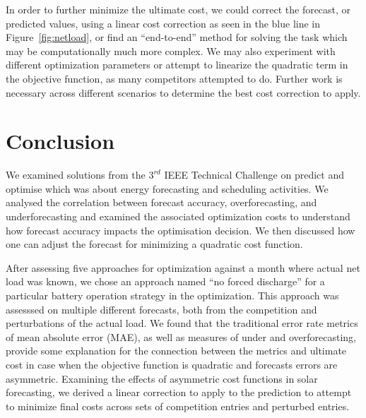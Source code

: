 \documentclass[conference]{IEEEtran}
\begin{document}

In order to further minimize the ultimate cost, we could correct the forecast, or predicted values, using a linear cost correction as seen in the blue line in Figure~\ref{fig:netload}, or find an ``end-to-end'' method for solving the task which may be computationally much more complex. We may also experiment with different optimization parameters or attempt to linearize the quadratic term in the objective function, as many competitors attempted to do. Further work is necessary across different scenarios to determine the best cost correction to apply.

\section{Conclusion}

We examined solutions from the $3^{rd}$ IEEE Technical Challenge on predict and optimise which was about energy forecasting and scheduling activities. We analysed the correlation between forecast accuracy, overforecasting, and underforecasting and examined the associated optimization costs to understand how forecast accuracy impacts the optimisation decision. We then discussed how one can adjust the forecast for minimizing a quadratic cost function. 

After assessing five approaches for optimization against a month where actual net load was known, we chose an approach named ``no forced discharge'' for a particular battery operation strategy in the optimization. This approach was assesssed on multiple different forecasts, both from the competition and perturbations of the actual load. We found that the traditional error rate metrics of mean absolute error (MAE), as well as measures of under and overforecasting, provide some explanation for the connection between the metrics and ultimate cost in case when the objective function is quadratic and forecasts errors are asymmetric. Examining the effects of asymmetric cost functions in solar forecasting, we derived a linear correction to apply to the prediction to attempt to minimize final costs across sets of competition entries and perturbed entries.

\end{document}
